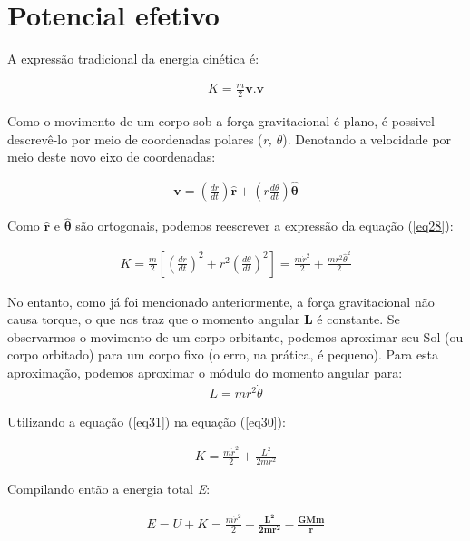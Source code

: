 \section{Potencial efetivo}

A expressão tradicional da energia cinética é:

\begin{eqnarray}
    K = \frac{m}{2}\mathbf{v.v} \label{eq28}
\end{eqnarray}

Como o movimento de um corpo sob a força gravitacional é plano, é possivel descrevê-lo por meio de coordenadas polares (\textit{r, $\theta$}). Denotando a velocidade por meio deste novo eixo de coordenadas:

\begin{eqnarray}
   \mathbf{v} = \left(\frac{dr}{dt}\right)\mathbf{\hat{r}} + \left(r\frac{d\theta}{dt}\right)\mathbf{\hat{\theta}} \label{eq29}
\end{eqnarray}

Como $\mathbf{\hat{r}}$ e $\mathbf{\hat{\theta}}$ são ortogonais, podemos reescrever a expressão da equação (\ref{eq28}):

\begin{eqnarray}
    K = \frac{m}{2}\left[\left(\frac{dr}{dt}\right)^2 + r^2\left(\frac{d\theta}{dt}\right)^2\right] = \frac{m\dot{r}^2}{2} + \frac{mr^2\hat{\theta}^2}{2} \label{eq30}
\end{eqnarray}

No entanto, como já foi mencionado anteriormente, a força gravitacional não causa torque, o que nos traz que o momento angular \textbf{L} é constante. Se observarmos o movimento de um corpo orbitante, podemos aproximar seu Sol (ou corpo orbitado) para um corpo fixo (o erro, na prática, é pequeno). Para esta aproximação, podemos aproximar o módulo do momento angular para:
\begin{eqnarray}
    L = mr^2\dot{\theta} \label{eq31}
\end{eqnarray}

Utilizando a equação (\ref{eq31}) na equação (\ref{eq30}):

\begin{eqnarray}
    K = \frac{m\dot{r}^2}{2} + \frac{L^2}{2mr^2} \label{eq32}
\end{eqnarray}

Compilando então a energia total \textit{E}:

\begin{eqnarray}
    E = U + K = \frac{m\dot{r}^2}{2} + \mathbf{\frac{L^2}{2mr^2} - \frac{GMm}{r}} \label{eq33}
\end{eqnarray}


